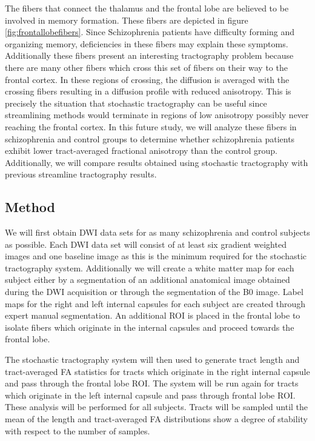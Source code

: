 The fibers that connect the thalamus and the frontal lobe are believed to be involved in memory formation.  These fibers are depicted in figure \ref{fig:frontallobefibers}.  Since Schizophrenia patients have difficulty forming and organizing memory, deficiencies in these fibers may explain these symptoms.  Additionally these fibers present an interesting tractography problem because there are many other fibers which cross this set of fibers on their way to the frontal cortex.  In these regions of crossing, the diffusion is averaged with the crossing fibers resulting in a diffusion profile with reduced anisotropy.  This is precisely the situation that stochastic tractography can be useful since streamlining methods would terminate in regions of low anisotropy possibly never reaching the frontal cortex.  In this future study, we will analyze these fibers in schizophrenia and control groups to determine whether schizophrenia patients exhibit lower tract-averaged fractional anisotropy than the control group.  Additionally, we will compare results obtained using stochastic tractography with previous streamline tractography results.

\subsection{Method}
We will first obtain DWI data sets for as many schizophrenia and control subjects as possible.  Each DWI data set will consist of at least six gradient weighted images and one baseline image as this is the minimum required for the stochastic tractography system.  Additionally we will create a white matter map for each subject either by a segmentation of an additional anatomical image obtained during the DWI acquisition or through the segmentation of the B0 image.  Label maps for the right and left internal capsules for each subject are created through expert manual segmentation.  An additional ROI is placed in the frontal lobe to isolate fibers which originate in the internal capsules and proceed towards the frontal lobe.

The stochastic tractography system will then used to generate tract length and tract-averaged FA statistics for tracts which originate in the right internal capsule and pass through the frontal lobe ROI.  The system will be run again for tracts which originate in the left internal capsule and pass through frontal lobe ROI.  These analysis will be performed for all subjects.  Tracts will be sampled until the mean of the length and tract-averaged FA distributions show a degree of stability with respect to the number of samples.


